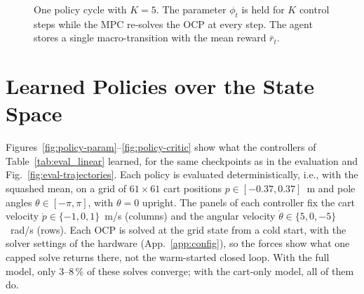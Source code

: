 \documentclass{l4dc2027}
\begin{document}
\begin{figure}[h]
  \centering
  \caption{One policy cycle with $K=5$. The parameter $\phi_t$ is held for $K$
  control steps while the \ac{MPC} re-solves the \ac{OCP} at every step. The
  agent stores a single macro-transition with the mean reward $\bar r_t$.}
  \label{fig:macro}
\end{figure}

\section{Learned Policies over the State Space}
\label{app:policies}
Figures~\ref{fig:policy-param}--\ref{fig:policy-critic} show what the
controllers of Table~\ref{tab:eval_linear} learned, for the same checkpoints
as in the evaluation and Fig.~\ref{fig:eval-trajectories}. Each policy is
evaluated deterministically, i.e., with the squashed mean, on a grid of
$61\times61$ cart positions $p\in[-0.37,0.37]$~m and pole angles
$\theta\in[-\pi,\pi]$, with $\theta=0$ upright. The panels of each controller
fix the cart velocity $\dot p\in\{-1,0,1\}$~m/s (columns) and the angular
velocity $\dot\theta\in\{5,0,-5\}$~rad/s (rows). Each \ac{OCP} is solved at the
grid state from a cold start, with the solver settings of the hardware
(App.~\ref{app:config}), so the forces show what one capped solve returns
there, not the warm-started closed loop. With the full model, only 3--8\,\% of
these solves converge; with the cart-only model, all of them do.
\end{document}
